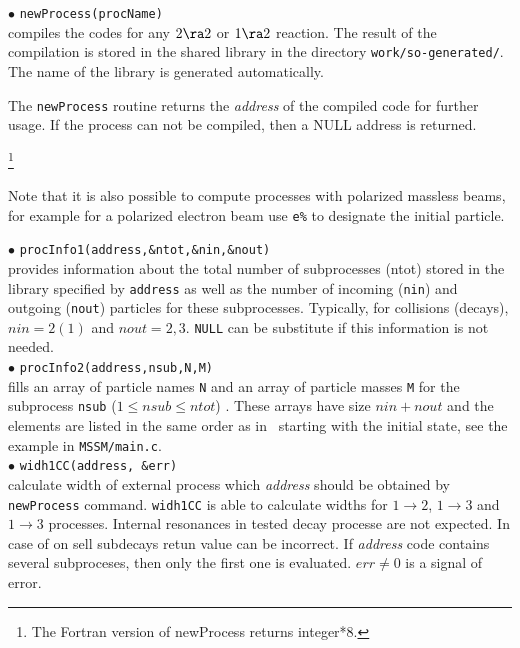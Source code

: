 \documentclass[12pt,a4paper]{article}
\begin{document}
\noindent
$\bullet$ \verb|newProcess(procName)|\\
compiles the  codes for any $2\ra 2$ or  $1\ra 2$  reaction.
The result of the compilation is stored in the  shared library  in the directory \verb|work/so-generated/|. The name of the library is generated
automatically.

The \verb|newProcess| routine returns the
{\it address} of the compiled code for further usage.   If the
process can not be compiled, then a NULL address is
returned. {\footnote{The  Fortran version of  newProcess returns integer*8. }


Note that it is also possible to compute processes with polarized massless beams, 
for example for a polarized electron beam use \verb|e%| to designate the initial
particle.



\noindent
$\bullet$ \verb|procInfo1(address,&ntot,&nin,&nout)|\\
provides information  about the total number of subprocesses
(ntot) stored in the library  specified by {\tt address} as well
as the number of incoming (\verb|nin|) and outgoing (\verb|nout|) particles for
these subprocesses. Typically, for collisions (decays), $nin=2(1)$ and $nout=2,3$.
\verb|NULL| can be substitute if this information is not needed. \\
$\bullet$ \verb|procInfo2(address,nsub,N,M)|\\
fills an array of
particle names \verb|N| and an array of particle  masses \verb|M| for the subprocess \verb|nsub| ($1\leq nsub \leq ntot$) . These
arrays have size $nin+nout$ and the elements are listed in the same order
as in \calchep\ starting with the initial state, see the example in 
\verb|MSSM/main.c|.\\

$\bullet$ \verb|widh1CC(address, &err)|\\
calculate width of external process which {\it address} should be obtained
by {\tt newProcess} command. {\tt widh1CC} is able to calculate widths for   $1\to2$,
$1\to3$ and $1\to3$ processes. Internal resonances in  tested decay
processe are not expected. In case of on sell subdecays retun value  can be
incorrect. If {\it address} code contains several  subproceses, then
only the first one is evaluated.  $err \ne 0$ is a signal of error. 



}
\end{document}
